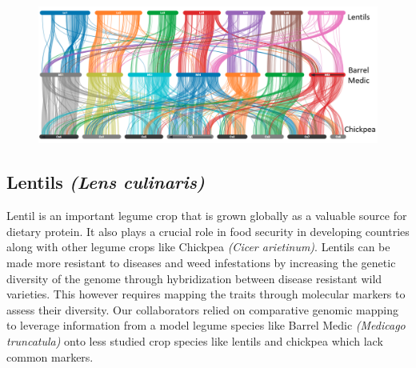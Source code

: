\begin{figure}
  \centering
  \includegraphics[width=1\linewidth]{images/ch_6_lentils.png}
  \label{fig:ch_6_lentils}
\end{figure}


\subsection{Lentils\textit{ (Lens culinaris)}}
Lentil is an important legume crop that is grown globally as a valuable source for dietary protein. It also plays a crucial role in food security in developing countries along with other legume crops like Chickpea \textit{(Cicer arietinum)}\cite{varshney2013draft}. Lentils can be made more resistant to diseases and weed infestations by increasing the genetic diversity of the genome through hybridization between disease resistant wild varieties. This however requires mapping the traits through molecular markers to assess their diversity. Our collaborators relied on comparative genomic mapping to leverage information from a model legume species like Barrel Medic \textit{(Medicago truncatula)} onto less studied crop species like lentils and chickpea which lack common markers.

